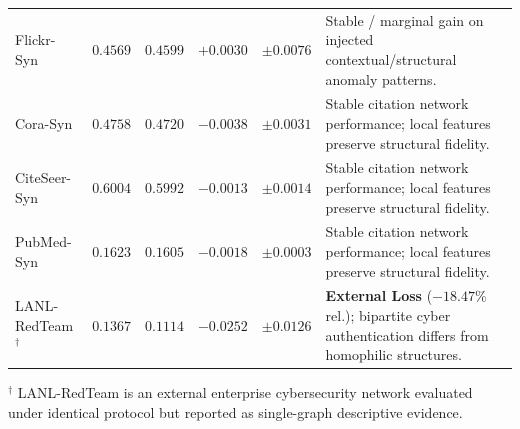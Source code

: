 \begin{table}[htbp]
\begin{tabularx}{\textwidth}{lrrrr>{\raggedright\arraybackslash}X}
Flickr-Syn & $0.4569$ & $0.4599$ & $+0.0030$ & $\pm 0.0076$ & Stable / marginal gain on injected contextual/structural anomaly patterns. \\
Cora-Syn & $0.4758$ & $0.4720$ & $-0.0038$ & $\pm 0.0031$ & Stable citation network performance; local features preserve structural fidelity. \\
CiteSeer-Syn & $0.6004$ & $0.5992$ & $-0.0013$ & $\pm 0.0014$ & Stable citation network performance; local features preserve structural fidelity. \\
PubMed-Syn & $0.1623$ & $0.1605$ & $-0.0018$ & $\pm 0.0003$ & Stable citation network performance; local features preserve structural fidelity. \\
LANL-RedTeam$^{\dagger}$ & $0.1367$ & $0.1114$ & $-0.0252$ & $\pm 0.0126$ & \textbf{External Loss} ($-18.47\%$ rel.); bipartite cyber authentication differs from homophilic structures. \\
\bottomrule
\end{tabularx}
\begin{tablenotes}\footnotesize
\item $^{\dagger}$ LANL-RedTeam is an external enterprise cybersecurity network evaluated under identical protocol but reported as single-graph descriptive evidence.
\end{tablenotes}
\end{table}
